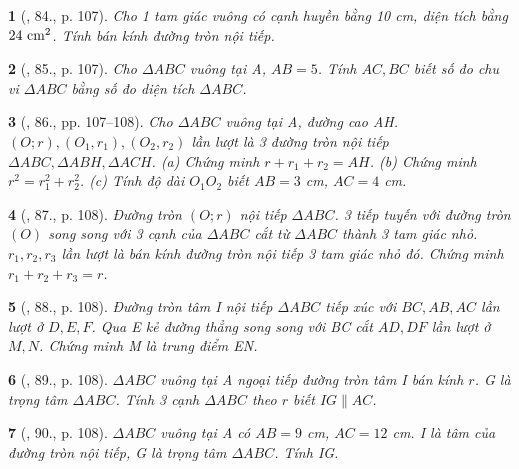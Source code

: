 \documentclass{article}
\newtheorem{baitoan}{}
\begin{document}
\begin{baitoan}[\cite{Binh_Toan_9_tap_1}, 84., p. 107]
	Cho 1 tam giác vuông có cạnh huyền bằng {\rm10 cm}, diện tích bằng $24\ {\rm cm}^2$. Tính bán kính đường tròn nội tiếp.
\end{baitoan}

\begin{baitoan}[\cite{Binh_Toan_9_tap_1}, 85., p. 107]
	Cho $\Delta ABC$ vuông tại A, $AB = 5$. Tính $AC,BC$ biết số đo chu vi $\Delta ABC$ bằng số đo diện tích $\Delta ABC$.
\end{baitoan}

\begin{baitoan}[\cite{Binh_Toan_9_tap_1}, 86., pp. 107--108]
	Cho $\Delta ABC$ vuông tại A, đường cao AH. $(O;r),(O_1,r_1),(O_2,r_2)$ lần lượt là 3 đường tròn nội tiếp $\Delta ABC,\Delta ABH,\Delta ACH$. (a) Chứng minh $r + r_1 + r_2 = AH$. (b) Chứng minh $r^2 = r_1^2 + r_2^2$. (c) Tính độ dài $O_1O_2$ biết $AB = 3$ {\rm cm}, $AC = 4$ {\rm cm}.
\end{baitoan}

\begin{baitoan}[\cite{Binh_Toan_9_tap_1}, 87., p. 108]
	Đường tròn $(O;r)$ nội tiếp $\Delta ABC$. 3 tiếp tuyến với đường tròn $(O)$ song song với 3 cạnh của $\Delta ABC$ cắt từ  $\Delta ABC$ thành 3 tam giác nhỏ. $r_1,r_2,r_3$ lần lượt là bán kính đường tròn nội tiếp 3 tam giác nhỏ đó. Chứng minh $r_1 + r_2 + r_3 = r$. 
\end{baitoan}

\begin{baitoan}[\cite{Binh_Toan_9_tap_1}, 88., p. 108]
	Đường tròn tâm I nội tiếp $\Delta ABC$ tiếp xúc với $BC,AB,AC$ lần lượt ở $D,E,F$. Qua E kẻ đường thẳng song song với BC cắt $AD,DF$ lần lượt ở $M,N$. Chứng minh M là trung điểm EN.
\end{baitoan}

\begin{baitoan}[\cite{Binh_Toan_9_tap_1}, 89., p. 108]
	$\Delta ABC$ vuông tại A ngoại tiếp đường tròn tâm I bán kính $r$. G là trọng tâm $\Delta ABC$. Tính 3 cạnh $\Delta ABC$ theo $r$ biết $IG\parallel AC$.
\end{baitoan}

\begin{baitoan}[\cite{Binh_Toan_9_tap_1}, 90., p. 108]
	$\Delta ABC$ vuông tại A có $AB = 9$ {\rm cm}, $AC = 12$ {\rm cm}. I là tâm của đường tròn nội tiếp, G là trọng tâm $\Delta ABC$. Tính IG.
\end{baitoan}
\end{document}
